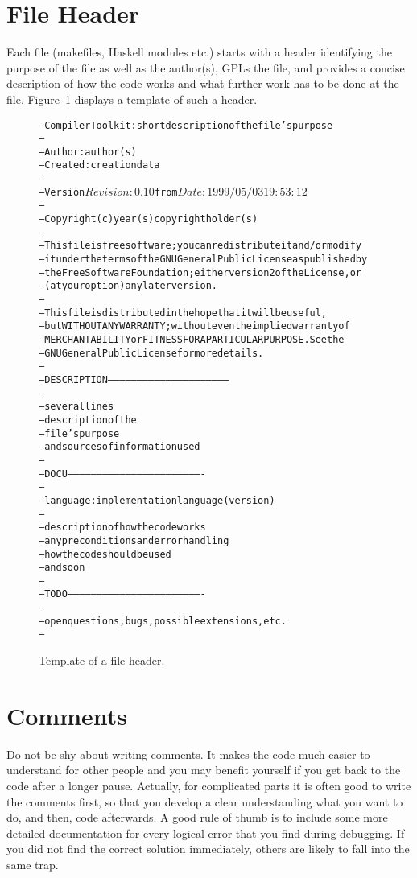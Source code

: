 \documentclass{report}
\newcommand{\schema}[1]{\textrm{#1}}
\begin{document}
\section{File Header}

Each file (makefiles, Haskell modules etc.) starts with a header identifying
the purpose of the file as well as the author(s), GPLs the file, and
provides a concise description of how the code works and what further work
has to be done at the file.  Figure~\ref{fig:file-header} displays a template
of such a header.
%
\begin{figure}
\begin{alltt}
--  Compiler Toolkit: \schema{short description of the file's purpose}
--
--  Author : \schema{author(s)}
--  Created: \schema{creation data}
--
--  Version $Revision: 0.10 $ from $Date: 1999/05/03 19:53:12 $
--
--  Copyright (c) \schema{year(s)} \schema{copyright holder(s)}
--
--  This file is free software; you can redistribute it and/or modify
--  it under the terms of the GNU General Public License as published by
--  the Free Software Foundation; either version 2 of the License, or
--  (at your option) any later version.
--
--  This file is distributed in the hope that it will be useful,
--  but WITHOUT ANY WARRANTY; without even the implied warranty of
--  MERCHANTABILITY or FITNESS FOR A PARTICULAR PURPOSE.  See the
--  GNU General Public License for more details.
--
--- DESCRIPTION ---------------------------------------------------------------
--
--  \schema{several lines}
--  \schema{description of the}
--  \schema{file's purpose}
--  \schema{and sources of information used}
--
--- DOCU ----------------------------------------------------------------------
--
--  language: \schema{implementation language (version)}
--
--  \schema{description of how the code works}
--  \schema{any preconditions and error handling}
--  \schema{how the code should be used}
--  \schema{and so on}
--
--- TODO ----------------------------------------------------------------------
--
--  \schema{open questions, bugs, possible extensions, etc.}
--
\end{alltt}
\caption{Template of a file header.}
\label{fig:file-header}
\end{figure}


\section{Comments}

Do not be shy about writing comments.  It makes the code much easier to
understand for other people and you may benefit yourself if you get back to
the code after a longer pause.  Actually, for complicated parts it is often
good to write the comments first, so that you develop a clear understanding
what you want to do, and then, code afterwards.  A good rule of thumb is to
include some more detailed documentation for every logical error that you find
during debugging.  If you did not find the correct solution immediately,
others are likely to fall into the same trap.
\end{document}
